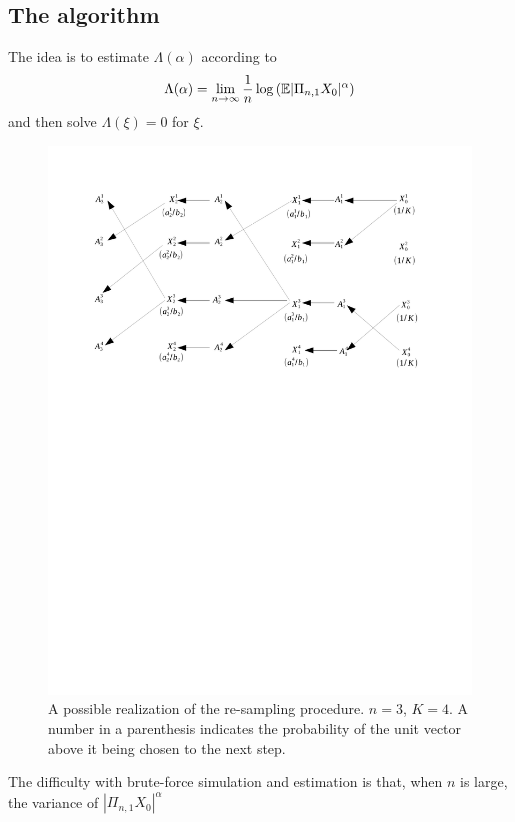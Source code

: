 \documentclass[aoas,preprint]{imsart}
\numberwithin{equation}{section}
\theoremstyle{plain}
\begin{document}
\subsection{The algorithm}
The idea is to estimate $\Lambda(\alpha)$ according to
\begin{equation}
  \label{eq:Lambda}
  \Lambda(\alpha) = \lim_{n \to \infty}{1 \over n} \log \left(
    \mathbb{E} |\Pi_{n, 1} X_0|^\alpha
  \right)
\end{equation}
and then solve $\Lambda(\xi) = 0$ for $\xi$.
\begin{figure}[htb!]
  \centering
  \includegraphics[width=\linewidth, trim=2cm 16cm 2.5cm 2cm, clip]{AnandsEstimator.pdf}
  \caption{A possible realization of the re-sampling procedure. $n =
    3$, $K = 4$. A number in a parenthesis indicates the probability
    of the unit vector above it being chosen to the next step.}
  \label{fig:AnandsEstimator}
\end{figure}
The difficulty with brute-force simulation and estimation is that,
when $n$ is large, the variance of $|\Pi_{n, 1} X_0|^\alpha$
\end{document}
